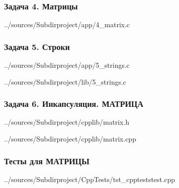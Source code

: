 \documentclass[12pt,a4paper]{report}
\begin{document}
\subsubsection{Задача 4. Матрицы}

{../sources/Subdirproject/app/4_matrix.c}
\newpage

\subsubsection{Задача 5. Строки}

{../sources/Subdirproject/app/5_strings.c}


{../sources/Subdirproject/lib/5_strings.c}
\newpage

\subsubsection{Задача 6. Инкапсуляция. МАТРИЦА}

{../sources/Subdirproject/cpplib/matrix.h}


{../sources/Subdirproject/cpplib/matrix.cpp}
\newpage

\subsubsection{Тесты для МАТРИЦЫ}

{../sources/Subdirproject/CppTests/tst_cppteststest.cpp}
\end{document}
